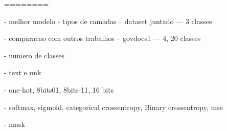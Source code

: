 

========

 - melhor modelo - tipos de camadas
 -- dataset juntado
 --- 3 classes
 
 - comparacao com outros trabalhos
 -- govdocs1
 --- 4, 20 classes
 
 - numero de classes
 
 - text e unk
 
 - one-hot, 8bits01, 8bits-11, 16 bits

 - softmax, sigmoid, categorical crossentropy, Binary crossentropy, mse
 
 - mask
 